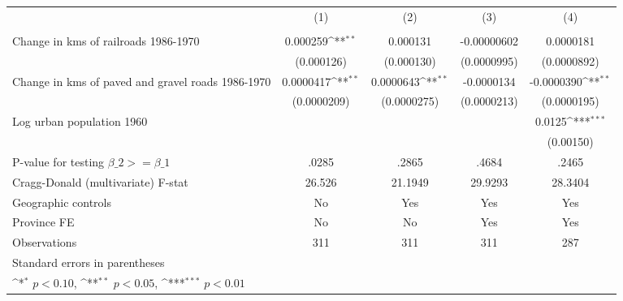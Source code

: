 {
\def\sym#1{\ifmmode^{#1}\else\(^{#1}\)\fi}
\begin{tabular}{l*{4}{c}}
\hline\hline
                &\multicolumn{1}{c}{(1)}&\multicolumn{1}{c}{(2)}&\multicolumn{1}{c}{(3)}&\multicolumn{1}{c}{(4)}\\
                &\multicolumn{1}{c}{}&\multicolumn{1}{c}{}&\multicolumn{1}{c}{}&\multicolumn{1}{c}{}\\
\hline
Change in kms of railroads 1986-1970& 0.000259\sym{**} & 0.000131         &-0.00000602         &0.0000181         \\
                &(0.000126)         &(0.000130)         &(0.0000995)         &(0.0000892)         \\
[1em]
Change in kms of paved and gravel roads 1986-1970&0.0000417\sym{**} &0.0000643\sym{**} &-0.0000134         &-0.0000390\sym{**} \\
                &(0.0000209)         &(0.0000275)         &(0.0000213)         &(0.0000195)         \\
[1em]
Log urban population 1960&                  &                  &                  &   0.0125\sym{***}\\
                &                  &                  &                  &(0.00150)         \\
\hline
P-value for testing $\beta\_{2} >= \beta\_{1}$&    .0285         &    .2865         &    .4684         &    .2465         \\
Cragg-Donald (multivariate) F-stat&   26.526         &  21.1949         &  29.9293         &  28.3404         \\
Geographic controls&       No         &      Yes         &      Yes         &      Yes         \\
Province FE     &       No         &       No         &      Yes         &      Yes         \\
Observations    &      311         &      311         &      311         &      287         \\
\hline\hline
\multicolumn{5}{l}{\footnotesize Standard errors in parentheses}\\
\multicolumn{5}{l}{\footnotesize \sym{*} \(p<0.10\), \sym{**} \(p<0.05\), \sym{***} \(p<0.01\)}\\
\end{tabular}
}
